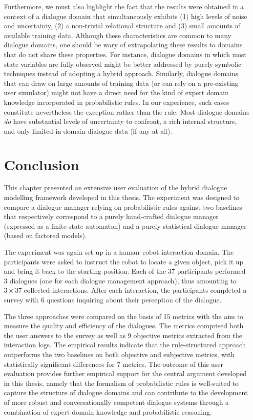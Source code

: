Furthermore, we must also highlight the fact that the results were obtained in a context of a dialogue domain that simultaneously exhibits (1) high levels of noise and uncertainty, (2) a non-trivial relational structure and (3) small amounts of available training data.  Although these characteristics are common to many  dialogue domains, one should be wary of extrapolating these results to domains that do not share these properties.  For instance, dialogue domains in which most state variables are fully observed might be better addressed by purely symbolic techniques instead of adopting a hybrid approach. Similarly, dialogue domains that can draw on large amounts of training data (or can rely on a pre-existing user simulator) might not have a direct need for the kind of expert domain knowledge incorporated in probabilistic rules.   In our experience, such cases constitute nevertheless the exception rather than the rule: Most dialogue domains \textit{do} have substantial levels of uncertainty to confront, a rich internal structure, and only limited in-domain dialogue data (if any at all).


\section{Conclusion}

This chapter presented an extensive user evaluation of the hybrid dialogue modelling framework developed in this thesis.  The experiment was designed to compare a dialogue manager relying on probabilistic rules against two baselines that respectively correspond to a purely hand-crafted dialogue manager (expressed as a finite-state automaton) and a purely statistical dialogue manager (based on factored models). 

The experiment was again set up in a human--robot interaction domain.  The participants were asked to instruct the robot to locate a given object, pick it up and bring it back to the starting position.  Each of the 37 participants performed 3 dialogues (one for each dialogue management approach), thus amounting to $3 \times 37$ collected interactions.  After each interaction, the participants completed a survey with 6 questions inquiring about their perception of the dialogue.  

The three approaches were compared on the basis of 15 metrics with the aim to measure the quality and efficiency of the dialogues. The metrics comprised both the user answers to the survey as well as 9 objective metrics extracted from the interaction logs.   The empirical results indicate that the rule-structured approach outperforms the two baselines on both objective and subjective metrics, with statistically significant differences for 7 metrics. The outcome of this user evaluation provides further empirical support for the central argument developed in this thesis, namely that the formalism of probabilistic rules is well-suited to capture the structure of dialogue domains and can contribute to the development of more robust and conversationally competent dialogue systems through a combination of expert domain knowledge and probabilistic reasoning. 



